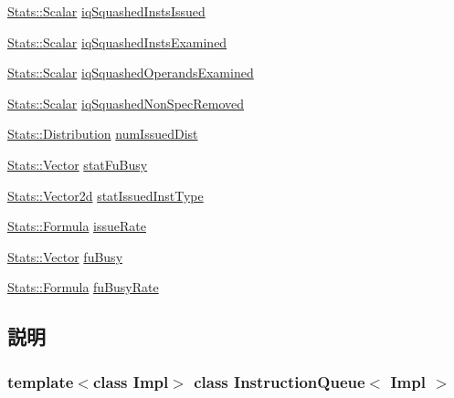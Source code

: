 \begin{DoxyCompactItemize}
\hyperlink{classStats_1_1Scalar}{Stats::Scalar} \hyperlink{classInstructionQueue_ac91799c895e5aff3af0afdbd7691a163}{iqSquashedInstsIssued}
\item 
\hyperlink{classStats_1_1Scalar}{Stats::Scalar} \hyperlink{classInstructionQueue_a8312e8984bcfab5a77de40e1738103db}{iqSquashedInstsExamined}
\item 
\hyperlink{classStats_1_1Scalar}{Stats::Scalar} \hyperlink{classInstructionQueue_a4398b6005b81008bd163bbba78dfd929}{iqSquashedOperandsExamined}
\item 
\hyperlink{classStats_1_1Scalar}{Stats::Scalar} \hyperlink{classInstructionQueue_a6c0b47431b6e84536fd9bb61624d6d97}{iqSquashedNonSpecRemoved}
\item 
\hyperlink{classStats_1_1Distribution}{Stats::Distribution} \hyperlink{classInstructionQueue_a90810f5beb7dff46f4b45f96620474b6}{numIssuedDist}
\item 
\hyperlink{classStats_1_1Vector}{Stats::Vector} \hyperlink{classInstructionQueue_a92266bfdbc9a6de5005fc3f1654e0b3e}{statFuBusy}
\item 
\hyperlink{classStats_1_1Vector2d}{Stats::Vector2d} \hyperlink{classInstructionQueue_abb8998de49604769ec252fbd0ac1ed2b}{statIssuedInstType}
\item 
\hyperlink{classStats_1_1Formula}{Stats::Formula} \hyperlink{classInstructionQueue_a6a9ed0564894e83d4c3c5784f667c5e0}{issueRate}
\item 
\hyperlink{classStats_1_1Vector}{Stats::Vector} \hyperlink{classInstructionQueue_a54dbf1e1683507aefb83115910feb26b}{fuBusy}
\item 
\hyperlink{classStats_1_1Formula}{Stats::Formula} \hyperlink{classInstructionQueue_ab1ecb3744ca63dcec2b9b7d80c319c69}{fuBusyRate}
\end{DoxyCompactItemize}


\subsection{説明}
\subsubsection*{template$<$class Impl$>$ class InstructionQueue$<$ Impl $>$}

